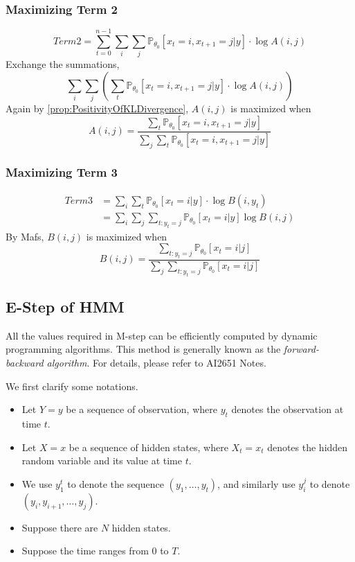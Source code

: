         \subsubsection{Maximizing Term 2}
        \[ Term2 = \sum_{t=0}^{n-1}\sum_i\sum_j \mathbb{P}_{\theta_0}[x_t=i,x_{t+1}=j|y] \cdot \log A(i,j) \]
        Exchange the summations,
        \[ \sum_i\sum_j \left(\sum_t \mathbb{P}_{\theta_0}[x_t=i,x_{t+1}=j|y] \cdot \log A(i,j)\right) \]
        Again by \ref{prop:PositivityOfKLDivergence}, $A(i,j)$ is maximized when
        \[ A(i,j) = \frac{\sum_t \mathbb{P}_{\theta_0}[x_t=i,x_{t+1}=j|y]}{\sum_j\sum_t \mathbb{P}_{\theta_0}[x_t=i,x_{t+1}=j|y]} \]

        \subsubsection{Maximizing Term 3}
        \begin{align*}
            Term3 &= \sum_i \sum_t \mathbb{P}_{\theta_0}[x_t=i|y]\cdot\log B(i,y_t)\\
            &= \sum_i \sum_j \sum_{t:y_t=j}\mathbb{P}_{\theta_0}[x_t=i|y]\log B(i,j)
        \end{align*}
        By Mafs, $B(i,j)$ is maximized when
        \[ B(i,j) = \frac{\sum_{t:y_t=j}\mathbb{P}_{\theta_0}[x_t=i|j]}{\sum_j\sum_{t:y_t=j}\mathbb{P}_{\theta_0}[x_t=i|j]} \]

    \subsection{E-Step of HMM}
        All the values required in M-step can be efficiently computed by dynamic programming algorithms. This method is generally known as the \emph{forward-backward algorithm}. For details, please refer to AI2651 Notes.

        We first clarify some notations.
        \begin{itemize}
            \item Let $Y=y$ be a sequence of observation, where $y_t$ denotes the observation at time $t$.
            \item Let $X=x$ be a sequence of hidden states, where $X_t=x_t$ denotes the hidden random variable and its value at time $t$.
            \item We use $y_1^t$ to denote the sequence $(y_1,\dots,y_t)$, and similarly use $y_i^j$ to denote $(y_i, y_{i+1},\dots, y_j)$.
            \item Suppose there are $N$ hidden states.
            \item Suppose the time ranges from $0$ to $T$.
        \end{itemize}
    
